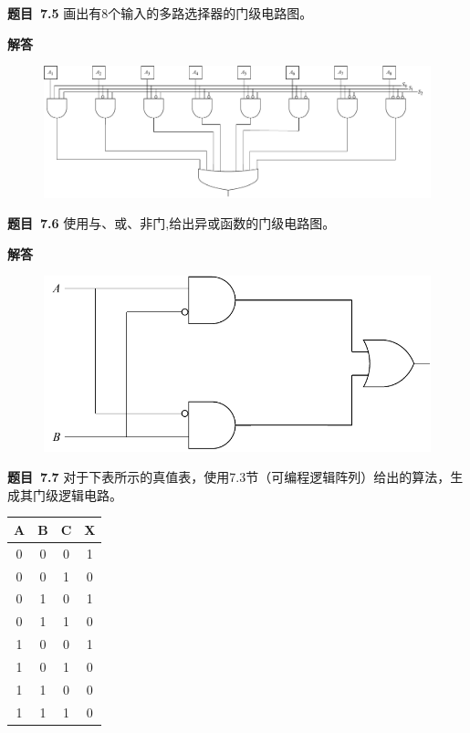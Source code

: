 \documentclass[10pt,a4paper,UTF8]{ctexart}
\newcommand{\problemname}{待定义}
\newenvironment{problem}{\begin{shaded}\par\noindent\textbf{题目\  \problemname}}{\end{shaded}\par}
\newenvironment{solution}{\par\noindent\textbf{解答}\ }{\par}
\begin{document}
\renewcommand{\problemname}{7.5}
\begin{problem}
	画出有8个输入的多路选择器的门级电路图。
\end{problem}

\begin{solution}
	\begin{figure}[H]
		\centering
		\includegraphics[scale=0.5]{img/7.5.pdf}
	\end{figure}
\end{solution}


\renewcommand{\problemname}{7.6}
\begin{problem}
	使用与、或、非门,给出异或函数的门级电路图。
\end{problem}

\begin{solution}
	\begin{figure}[H]
		\centering
		\includegraphics[scale=0.5]{img/7.6.pdf}
	\end{figure}

\end{solution}


\renewcommand{\problemname}{7.7}
\begin{problem}
	对于下表所示的真值表，使用7.3节（可编程逻辑阵列）给出的算法，生成其门级逻辑电路。
\end{problem}
\begin{table}[H]
	\centering
	\begin{tabular}{|c|c|c|c|}
	\hline
	A & B & C & X \\ \hline
	0 & 0 & 0 & 1 \\ \hline
	0 & 0 & 1 & 0 \\ \hline
	0 & 1 & 0 & 1 \\ \hline
	0 & 1 & 1 & 0 \\ \hline
	1 & 0 & 0 & 1 \\ \hline
	1 & 0 & 1 & 0 \\ \hline
	1 & 1 & 0 & 0 \\ \hline
	1 & 1 & 1 & 0 \\ \hline
	\end{tabular}
\end{table}
\end{document}
